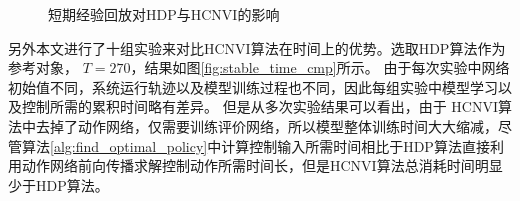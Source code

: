 \begin{figure}[!ht]
\centering 
    \caption{短期经验回放对HDP与HCNVI的影响 }
    \label{fig:stable_replay_cmp}
\end{figure}

另外本文进行了十组实验来对比HCNVI算法在时间上的优势。选取HDP算法作为参考对象，
$T=270$，结果如图\ref{fig:stable_time_cmp}所示。
由于每次实验中网络初始值不同，系统运行轨迹以及模型训练过程也不同，因此每组实验中模型学习以及控制所需的累积时间略有差异。
但是从多次实验结果可以看出，由于
HCNVI算法中去掉了动作网络，仅需要训练评价网络，所以模型整体训练时间大大缩减，尽管算法\ref{alg:find_optimal_policy}中计算控制输入所需时间相比于HDP算法直接利用动作网络前向传播求解控制动作所需时间长，但是HCNVI算法总消耗时间明显少于HDP算法。

